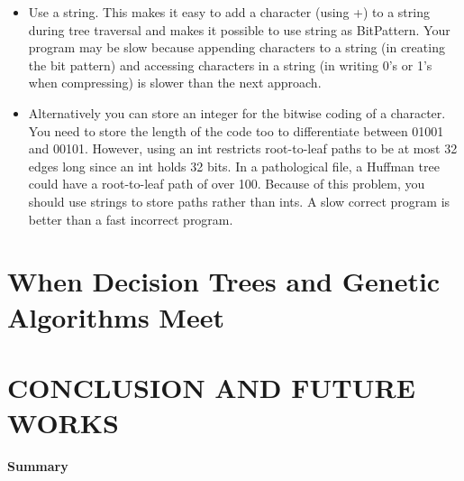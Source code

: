 \documentclass[12pt]{report}
\begin{document}
\begin{itemize}

\item    Use a string. This makes it easy to add a character (using +) to a string during tree traversal and makes it possible to use string as BitPattern. Your program may be slow because appending characters to a string (in creating the bit pattern) and accessing characters in a string (in writing 0's or 1's when compressing) is slower than the next approach.

\item    Alternatively you can store an integer for the bitwise coding of a character. You need to store the length of the code too to differentiate between 01001 and 00101. However, using an int restricts root-to-leaf paths to be at most 32 edges long since an int holds 32 bits. In a pathological file, a Huffman tree could have a root-to-leaf path of over 100. Because of this problem, you should use strings to store paths rather than ints. A slow correct program is better than a fast incorrect program. 

\end{itemize}


\pagestyle{fancy}
\chead{}
\rfoot{\small{\thepage}}
\renewcommand{\headrulewidth}{0.4pt}
\renewcommand{\footrulewidth}{0.4pt}
\chapter{When Decision Trees and Genetic Algorithms Meet}


\pagestyle{fancy}
\chead{}
\rfoot{\small{\thepage}}
\renewcommand{\headrulewidth}{0.4pt}
\renewcommand{\footrulewidth}{0.4pt}
\chapter{CONCLUSION AND FUTURE WORKS}

\textbf{Summary}
\end{document}
